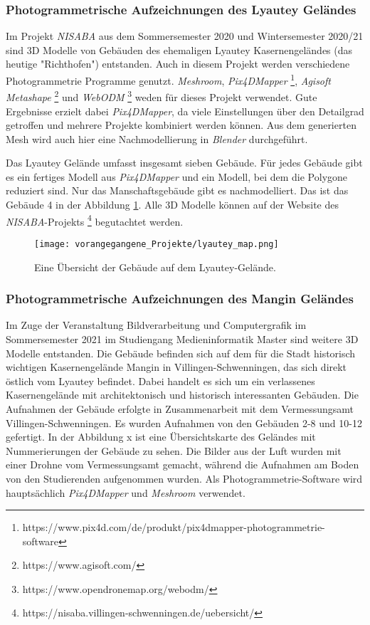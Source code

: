\subsubsection{Photogrammetrische Aufzeichnungen des Lyautey Geländes}
Im Projekt \textit{NISABA} \cite{nisaba2021} aus dem Sommersemester 2020 und Wintersemester 2020/21 sind 3D Modelle von Gebäuden des ehemaligen Lyautey Kasernengeländes (das heutige "Richthofen") entstanden. Auch in diesem Projekt werden verschiedene Photogrammetrie Programme genutzt. \textit{Meshroom}, \textit{Pix4DMapper} \footnote{https://www.pix4d.com/de/produkt/pix4dmapper-photogrammetrie-software}, \textit{Agisoft Metashape} \footnote{https://www.agisoft.com/} und \textit{WebODM} \footnote{https://www.opendronemap.org/webodm/} weden für dieses Projekt verwendet. Gute Ergebnisse erzielt dabei \textit{Pix4DMapper}, da viele Einstellungen über den Detailgrad getroffen und mehrere Projekte kombiniert werden können. Aus dem generierten Mesh wird auch hier eine Nachmodellierung in \textit{Blender} durchgeführt.

Das Lyautey Gelände umfasst insgesamt sieben Gebäude. Für jedes Gebäude gibt es ein fertiges Modell aus \textit{Pix4DMapper} und ein Modell, bei dem die Polygone reduziert sind. Nur das Manschaftsgebäude gibt es nachmodelliert. Das ist das Gebäude 4 in der Abbildung \ref{fig:lyautey-map}. Alle 3D Modelle können auf der Website des \textit{NISABA}-Projekts \footnote{https://nisaba.villingen-schwenningen.de/uebersicht/} begutachtet werden. 

\begin{figure}[h]
    \centering
    \texttt{[image: vorangegangene\_Projekte/lyautey\_map.png]}
    \caption{Eine Übersicht der Gebäude auf dem Lyautey-Gelände.}
    \label{fig:lyautey-map}
\end{figure}

\subsubsection{Photogrammetrische Aufzeichnungen des Mangin Geländes}
Im Zuge der Veranstaltung Bildverarbeitung und Computergrafik im Sommersemester 2021 im Studiengang Medieninformatik Master sind weitere 3D Modelle entstanden\cite{kusch2021}. Die Gebäude befinden sich auf dem für die Stadt historisch wichtigen Kasernengelände Mangin in Villingen-Schwenningen, das sich direkt östlich vom Lyautey befindet. Dabei handelt es sich um ein verlassenes Kasernengelände mit architektonisch und historisch interessanten Gebäuden. Die Aufnahmen der Gebäude erfolgte in Zusammenarbeit mit dem Vermessungsamt Villingen-Schwenningen. Es wurden Aufnahmen von den Gebäuden 2-8 und 10-12 gefertigt. In der Abbildung x ist eine Übersichtskarte des Geländes mit Nummerierungen der Gebäude zu sehen.  Die Bilder aus der Luft wurden mit einer Drohne vom Vermessungsamt gemacht, während die Aufnahmen am Boden von den Studierenden aufgenommen wurden. Als Photogrammetrie-Software wird hauptsächlich \textit{Pix4DMapper} und \textit{Meshroom} verwendet. 

